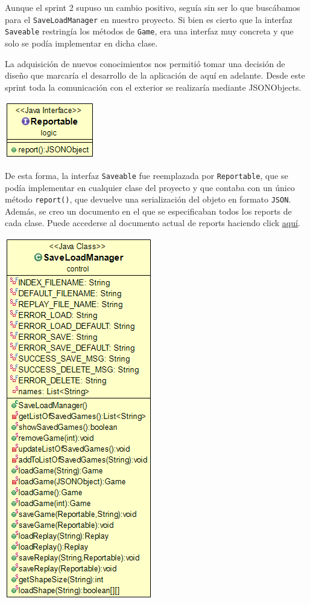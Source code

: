 \documentclass[../DocumentoOficial.tex]{subfiles}
\begin{document}
\begin{sprint}[3]
Aunque el sprint 2 supuso un cambio positivo, seguía sin ser lo que buscábamos para el \texttt{SaveLoadManager} en nuestro proyecto. Si bien es cierto que la interfaz \texttt{Saveable} restringía los métodos de \texttt{Game}, era una interfaz muy concreta y que solo se podía implementar en dicha clase.

La adquisición de nuevos conocimientos nos permitió tomar una decisión de diseño que marcaría el desarrollo de la aplicación de aquí en adelante. Desde este sprint toda la comunicación con el exterior se realizaría mediante JSONObjects.

\begin{center}
\centering
\includegraphics[scale=0.5]{reportable.png}
\end{center}

De esta forma, la interfaz \texttt{Saveable} fue reemplazada por \texttt{Reportable}, que se podía implementar en cualquier clase del proyecto y que contaba con un único método \texttt{report()}, que devuelve una serialización del objeto en formato \texttt{JSON}. Además, se creo un documento en el que se especificaban todos los reports de cada clase. Puede accederse al documento actual de reports haciendo click \hyperref[ch:AnexoI]{aquí}.

\newpage
\begin{center}
\centering
\includegraphics[scale=0.5]{save-load-manager-sprint3.png}
\end{center}


\end{sprint}
\end{document}
